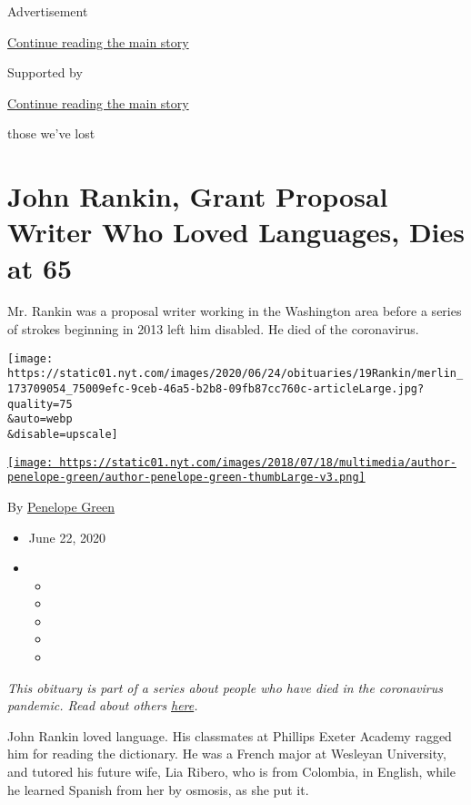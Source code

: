 Advertisement

\protect\hyperlink{after-top}{Continue reading the main story}

Supported by

\protect\hyperlink{after-sponsor}{Continue reading the main story}

those we've lost

\hypertarget{john-rankin-grant-proposal-writer-who-loved-languages-dies-at-65}{%
\section{John Rankin, Grant Proposal Writer Who Loved Languages, Dies at
65}\label{john-rankin-grant-proposal-writer-who-loved-languages-dies-at-65}}

Mr. Rankin was a proposal writer working in the Washington area before a
series of strokes beginning in 2013 left him disabled. He died of the
coronavirus.

\texttt{[image: https://static01.nyt.com/images/2020/06/24/obituaries/19Rankin/merlin\_173709054\_75009efc-9ceb-46a5-b2b8-09fb87cc760c-articleLarge.jpg?quality=75\\\&auto=webp\\\&disable=upscale]}

\href{https://www.nytimes.com/by/penelope-green}{\texttt{[image: https://static01.nyt.com/images/2018/07/18/multimedia/author-penelope-green/author-penelope-green-thumbLarge-v3.png]}}

By \href{https://www.nytimes.com/by/penelope-green}{Penelope Green}

\begin{itemize}
\item
  June 22, 2020
\item
  \begin{itemize}
  \item
  \item
  \item
  \item
  \item
  \end{itemize}
\end{itemize}

\emph{This obituary is part of a series about people who have died in
the coronavirus pandemic. Read about others}
\href{https://www.nytimes.com/interactive/2020/obituaries/people-died-coronavirus-obituaries.html}{\emph{here}}\emph{.}

John Rankin loved language. His classmates at Phillips Exeter Academy
ragged him for reading the dictionary. He was a French major at Wesleyan
University, and tutored his future wife, Lia Ribero, who is from
Colombia, in English, while he learned Spanish from her by osmosis, as
she put it.

